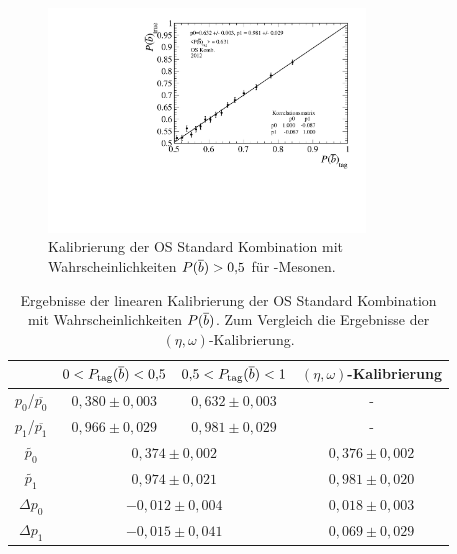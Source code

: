  \begin{figure}[htbp]
	\centering
		\includegraphics[width=0.75\textwidth]{fig/calibration_B.pdf}
	\caption{Kalibrierung der OS Standard Kombination mit Wahrscheinlichkeiten $P({\overline {{b}}})>0{,}5$ für \Bz-Mesonen.}
	\label{fig:PBgetrennt2} 
\end{figure} 
\begin{table}[htbp]
	\centering
	\caption{Ergebnisse der linearen Kalibrierung der OS Standard Kombination mit Wahrscheinlichkeiten $P({\overline {{b}}})$. Zum Vergleich die Ergebnisse der $(\eta,\omega)$-Kalibrierung.}
	\label{tab:PBgetrennt} 
	\begin{tabular}{c|ccc}
	\toprule
	 & $0<P_\text{tag}({\overline {{b}}})<0{,}5$ & $0{,}5<P_\text{tag}({\overline {{b}}})<1$ & $(\eta,\omega)$-Kalibrierung \\ 
	 \midrule
      $p_0$/$\overline{p_0}$  & $0{,}380\pm0{,}003$ & $0{,}632\pm0{,}003$ & - \\  
      $p_1$/$\overline{p_1}$ & $0{,}966\pm0{,}029$ & $0{,}981\pm0{,}029$ & - \\
      $\widetilde{p_0}$ & \multicolumn{2}{c}{$0{,}374\pm0{,}002$} &  $0{,}376\pm0{,}002$ \\
      $\widetilde{p_1}$ &  \multicolumn{2}{c}{$0{,}974\pm0{,}021$} &  $0{,}981\pm0{,}020$ \\
      $\Delta p_0$ & \multicolumn{2}{c}{$-0{,}012\pm0{,}004$} &  $0{,}018\pm0{,}003$ \\
      $\Delta p_1$ & \multicolumn{2}{c}{$-0{,}015\pm0{,}041$} &  $0{,}069\pm0{,}029$ \\ 
      \bottomrule
	\end{tabular}
\end{table}
